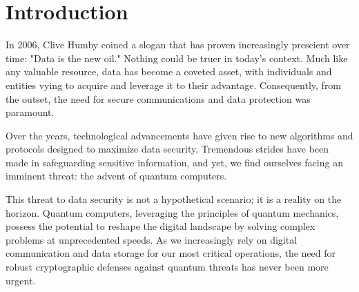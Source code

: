 \section{Introduction}
In 2006, Clive Humby coined a slogan that has proven increasingly prescient over time: "Data is the new oil." Nothing could be truer in today's context. Much like any valuable resource, data has become a coveted asset, with individuals and entities vying to acquire and leverage it to their advantage. Consequently, from the outset, the need for secure communications and data protection was paramount.

Over the years, technological advancements have given rise to new algorithms and protocols designed to maximize data security. Tremendous strides have been made in safeguarding sensitive information, and yet, we find ourselves facing an imminent threat: the advent of quantum computers.

This threat to data security is not a hypothetical scenario; it is a reality on the horizon. Quantum computers, leveraging the principles of quantum mechanics, possess the potential to reshape the digital landscape by solving complex problems at unprecedented speeds. As we increasingly rely on digital communication and data storage for our most critical operations, the need for robust cryptographic defenses against quantum threats has never been more urgent.
